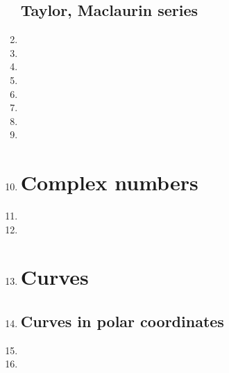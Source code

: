 \documentclass{article}
\begin{document}
\begin{enumerate}
\subsection{Taylor, Maclaurin series}
\item 
\item 
\item 
\item 
\item 


\item 

\item 

\item 
\item 
\section{Complex numbers}
\item 
\item 
\item 
\section{Curves}
\item 
\subsection{Curves in polar coordinates}
\item 
\item 

\end{enumerate}
\end{document}
